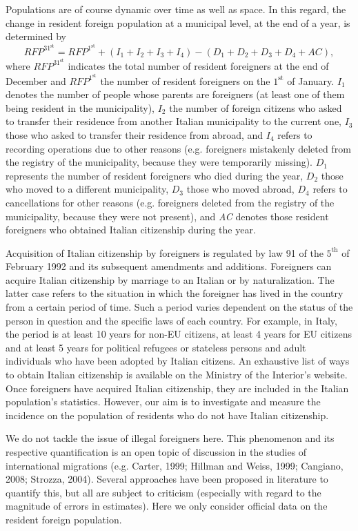 Populations are of course dynamic over time as well as space. In this regard, the change in resident foreign population at a municipal level, at the end of a year, is determined by
$$
RFP^{31^\text{st}} = RFP^{1^\text{st}} + (I_1 + I_2 + I_3+ I_4) - (D_1 + D_2 + D_3 + D_4 + AC),
$$ 
where $RFP^{31^\text{st}}$ indicates the total number of resident foreigners at the end of December and $RFP^{1^\text{st}}$ the number of resident foreigners on the $1^\text{st}$ of January. $I_{1}$ denotes the number of people whose parents are foreigners (at least one of them being resident in the municipality), $I_{2}$ the number of foreign citizens who asked to transfer their residence from another Italian municipality to the current one, $I_{3}$ those who asked to transfer their residence from abroad, and $I_{4}$ refers to recording operations due to other reasons (e.g. foreigners mistakenly deleted from the registry of the municipality, because they were temporarily missing). $D_{1}$ represents the number of resident foreigners who died during the year, $D_{2}$ those who moved to a different municipality, $D_{3}$ those who moved abroad, $D_{4}$ refers to cancellations for other reasons (e.g. foreigners deleted from the registry of the municipality, because they were not present), and \textit{AC} denotes those resident foreigners who obtained Italian citizenship during the year. 

Acquisition of Italian citizenship by foreigners is regulated by law 91 of the $5^\text{th}$ of February 1992 and its subsequent amendments and additions. Foreigners can acquire Italian citizenship by marriage to an Italian or by naturalization. The latter case refers to the situation in which the foreigner has lived in the country from a certain period of time. Such a period varies dependent on the status of the person in question and the specific laws of each country. For example, in Italy, the period is at least 10 years for non-EU citizens, at least 4 years for EU citizens and at least 5 years for political refugees or stateless persons and adult individuals who have been adopted by Italian citizens. An exhaustive list of ways to obtain Italian citizenship is available on the Ministry of the Interior's website. Once foreigners have acquired Italian citizenship, they are included in the Italian population's statistics. However, our aim is to investigate and measure the incidence on the population of  residents who do not have Italian citizenship.

We do not tackle the issue of illegal foreigners here. This phenomenon and its respective quantification is an open topic of discussion in the studies of international migrations (e.g. Carter, 1999; Hillman and Weiss, 1999; Cangiano, 2008; Strozza, 2004). Several approaches have been proposed in literature to quantify this, but all are subject to criticism (especially with regard to the magnitude of errors in estimates). Here we only consider official data on the resident foreign population. 

